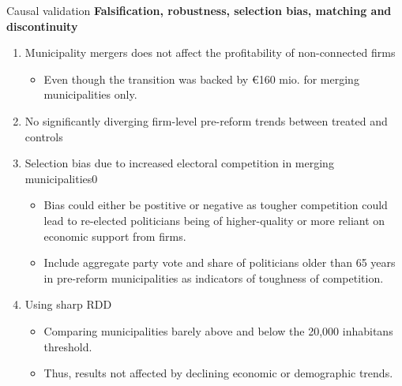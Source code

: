 \documentclass[8pt]{beamer}
\begin{document}
\begin{frame}{Causal validation}
  \textbf{Falsification, robustness, selection bias, matching and discontinuity}
  \begin{enumerate}
    \item Municipality mergers does not affect the profitability of non-connected firms
    \begin{itemize}
      \item Even though the transition was backed by €160 mio. for merging municipalities only.
    \end{itemize}
    \item No significantly diverging firm-level pre-reform trends between treated and controls
    \item Selection bias due to increased electoral competition in merging municipalities0
    \begin{itemize}
      \item Bias could either be postitive or negative as tougher competition could lead to re-elected politicians being of higher-quality or more reliant on economic support from firms.
      \item Include aggregate party vote and share of politicians older than 65 years in pre-reform municipalities as indicators of toughness of competition.
    \end{itemize}
    \item Using sharp RDD
    \begin{itemize}
      \item Comparing municipalities barely above and below the 20,000 inhabitans threshold.
      \item Thus, results not affected by declining economic or demographic trends.
    \end{itemize}
  \end{enumerate}
\end{frame}
\end{document}
